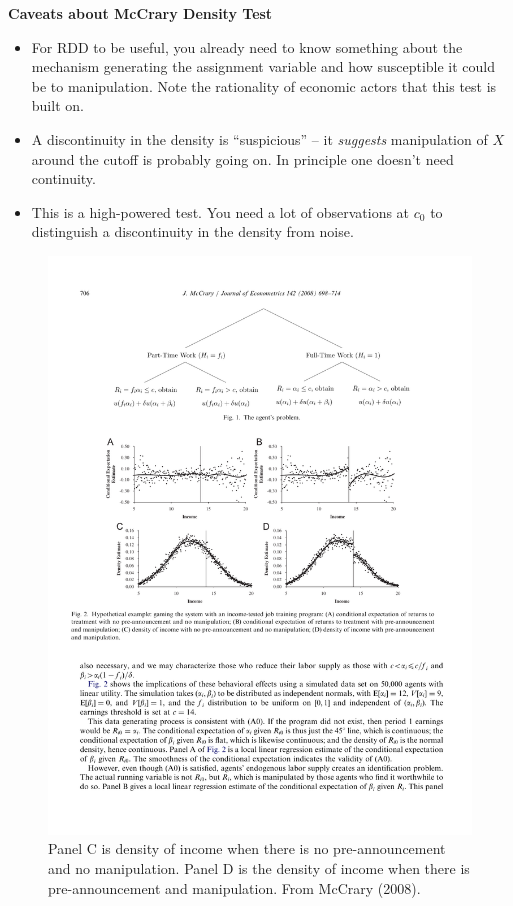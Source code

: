 \documentclass[notes=show]{beamer}
\begin{document}
\begin{frame}[shrink=20,plain]
	\begin{center}
	\textbf{Caveats about McCrary Density Test}
	\end{center}
	
	\begin{itemize}
		\item For RDD to be useful, you already need to know something about the mechanism generating the assignment variable and how susceptible it could be to manipulation. Note the rationality of economic actors that this test is built on.
		\item A discontinuity in the density is ``suspicious'' -- it \emph{suggests} manipulation of $X$ around the cutoff is probably going on. In principle one doesn't need continuity.  
		\item This is a high-powered test. You need a lot of observations at $c_0$ to distinguish a discontinuity in the density from noise.  
	\end{itemize}

	\begin{figure}
	\includegraphics[scale=0.75]{./lecture_includes/mccrary_density_test.pdf}
	\caption{\scriptsize Panel C is density of income when there is no pre-announcement and no manipulation. Panel D is the density of income when there is pre-announcement and manipulation. From McCrary (2008).}
	\end{figure}

\end{frame}
\end{document}
